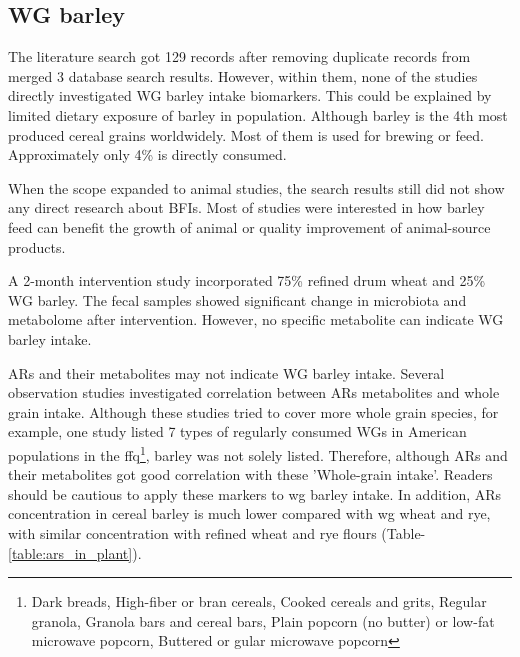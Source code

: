 \subsection{WG barley}
The literature search got 129 records after removing duplicate records from merged 3 database search results. However, within them, none of the studies directly investigated WG barley intake biomarkers. This could be explained by limited dietary exposure of barley in population. Although barley is the 4th most produced cereal grains worldwidely. Most of them is used for brewing or feed. Approximately only 4\% is directly consumed\cite{Baik2008}.

When the scope expanded to animal studies, the search results still did not show any direct research about BFIs. Most of studies were interested in how barley feed can benefit the growth of animal or quality improvement of animal-source products\cite{ISI:000272990200002,Foster2003}.

A 2-month intervention study\cite{DeAngelis2015} incorporated 75\% refined drum wheat and 25\% WG barley. The fecal samples showed significant change in microbiota and metabolome after intervention\cite{DeAngelis2015}. However, no specific metabolite can indicate WG barley intake.

ARs and their metabolites may not indicate WG barley intake. Several observation studies\cite{ISI:000309032000011,ISI:000259554500019} investigated correlation between ARs metabolites and whole grain intake. Although these studies tried to cover more whole grain species, for example, one study\cite{ISI:000259554500019} listed 7 types of regularly consumed WGs in American populations in the \acrfull{ffq}\footnote{Dark breads, High-fiber or bran cereals, Cooked cereals and grits, Regular granola, Granola bars and cereal bars, Plain popcorn (no butter) or low-fat microwave popcorn, Buttered or gular microwave popcorn}, barley was not solely listed. Therefore, although ARs and their metabolites got good correlation with these 'Whole-grain intake'. Readers should be cautious to apply these markers to \acrshort{wg} barley intake. In addition, ARs concentration in cereal barley is much lower compared with \acrshort{wg} wheat and rye, with similar concentration with refined wheat and rye flours (Table-\ref{table:ars_in_plant}). 

